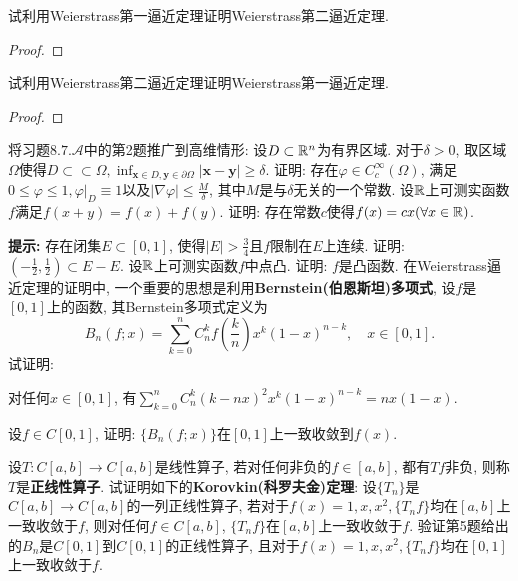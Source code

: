 \begin{quizb}
\woe 试利用Weierstrass第一逼近定理证明Weierstrass第二逼近定理.
\begin{proof}

\end{proof}
\woe 试利用Weierstrass第二逼近定理证明Weierstrass第一逼近定理.
\begin{proof}

\end{proof}
\woe 将习题\(8.7.\boldsymbol{\mathcal{A}}\)中的第2题推广到高维情形: 设\(D\subset\mathbb{R}^n\)为有界区域. 对于\(\delta>0\), 取区域\(\varOmega\)使得\(D\subset\subset \varOmega,\inf_{\boldsymbol{x}\in D,\boldsymbol{y}\in\partial\varOmega}|\boldsymbol{x}-\boldsymbol{y}|\geqslant\delta\). 证明: 存在\(\varphi\in C_c^{\infty}(\varOmega)\), 满足\(0\leqslant\varphi\leqslant 1,\varphi\big|_D\equiv 1\)以及\(|\nabla\varphi|\leqslant\frac{M}{\delta}\), 其中\(M\)是与\(\delta\)无关的一个常数.
\woe 设\(\mathbb{R}\)上可测实函数\(f\)满足\(f(x+y)=f(x)+f(y)\). 证明: 存在常数\(c\)使得\(f(x)=cx(\forall x\in\mathbb{R})\).

\textbf{提示: }存在闭集\(E\subset [0,1]\), 使得\(|E|>\frac{3}{4}\)且\(f\)限制在\(E\)上连续. 证明: \(\left(-\frac{1}{2},\frac{1}{2}\right)\subset E-E\).
\woe 设\(\mathbb{R}\)上可测实函数\(f\)中点凸. 证明: \(f\)是凸函数.
\woe 在Weierstrass逼近定理的证明中, 一个重要的思想是利用\textbf{Bernstein(伯恩斯坦)多项式}, 设\(f\)是\([0,1]\)上的函数, 其Bernstein多项式定义为\[B_n(f;x)=\sum_{k=0}^{n}C_n^kf\left(\frac{k}{n}\right)x^k(1-x)^{n-k},\quad x\in[0,1].\]试证明:\begin{quizs}
\item 对任何\(x\in[0,1]\), 有\(\sum_{k=0}^{n}C_n^k(k-nx)^2x^k(1-x)^{n-k}=nx(1-x).\)
\item 设\(f\in C[0,1]\), 证明: \(\{B_n(f;x)\}\)在\([0,1]\)上一致收敛到\(f(x)\).
\end{quizs}
\woe 设\(T: C[a,b]\rightarrow C[a,b]\)是线性算子, 若对任何非负的\(f\in[a,b]\), 都有\(Tf\)非负, 则称\(T\)是\textbf{正线性算子}. 试证明如下的\textbf{Korovkin(科罗夫金)定理}: 设\(\{T_n\}\)是\(C[a,b]\rightarrow C[a,b]\)的一列正线性算子, 若对于\(f(x)=1,x,x^2,\{T_nf\}\)均在\([a,b]\)上一致收敛于\(f\), 则对任何\(f\in C[a,b]\), \(\{T_nf\}\)在\([a,b]\)上一致收敛于\(f\).
\woe 验证第5题给出的\(B_n\)是\(C[0,1]\)到\(C[0,1]\)的正线性算子, 且对于\(f(x)=1,x,x^2,\{T_nf\}\)均在\([0,1]\)上一致收敛于\(f\).
\end{quizb}
